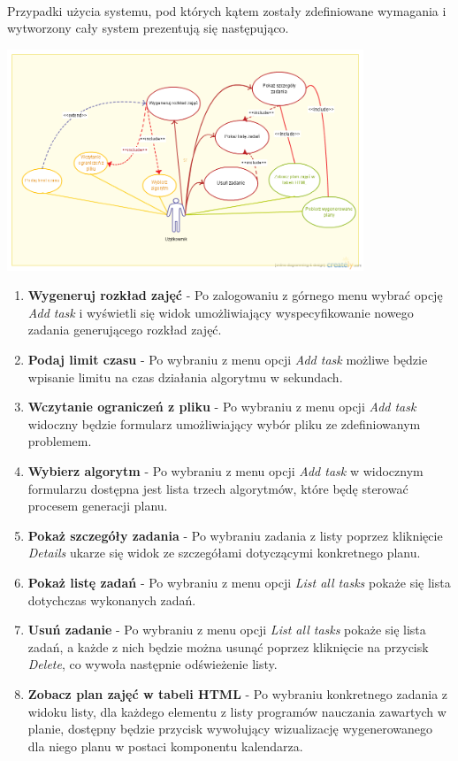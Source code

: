 \paragraph{}Przypadki użycia systemu, pod których kątem zostały zdefiniowane wymagania i wytworzony cały system prezentują się następująco.
\begin{center}
\includegraphics[width=0.8\textwidth]{img/InzynierkaUseCase.png}
\end{center}
\begin{enumerate}
\item \textbf{Wygeneruj rozkład zajęć} - Po zalogowaniu z górnego menu wybrać opcję \emph{Add task} i wyświetli się widok umożliwiający wyspecyfikowanie nowego zadania generującego rozkład zajęć.
\item \textbf{Podaj limit czasu} - Po wybraniu z menu opcji \emph{Add task} możliwe będzie wpisanie limitu na czas działania algorytmu w sekundach.
\item \textbf{Wczytanie ograniczeń z pliku} - Po wybraniu z menu opcji \emph{Add task} widoczny będzie formularz umożliwiający wybór pliku ze zdefiniowanym problemem.
\item \textbf{Wybierz algorytm} - Po wybraniu z menu opcji \emph{Add task} w widocznym formularzu dostępna jest lista trzech algorytmów, które będę sterować procesem generacji planu.
\item \textbf{Pokaż szczegóły zadania} - Po wybraniu zadania z listy poprzez kliknięcie \emph{Details} ukarze się widok ze szczegółami dotyczącymi konkretnego planu.
\item \textbf{Pokaż listę zadań} - Po wybraniu z menu opcji \emph{List all tasks} pokaże się lista dotychczas wykonanych zadań.
\item \textbf{Usuń zadanie} - Po wybraniu z menu opcji \emph{List all tasks} pokaże się lista zadań, a każde z nich będzie można usunąć poprzez kliknięcie na przycisk \emph{Delete}, co wywoła następnie odświeżenie listy.
\item \textbf{Zobacz plan zajęć w tabeli HTML} - Po wybraniu konkretnego zadania z widoku listy, dla każdego elementu z listy programów nauczania zawartych w planie, dostępny będzie przycisk wywołujący wizualizację wygenerowanego dla niego planu w postaci komponentu kalendarza.
\end{enumerate}
